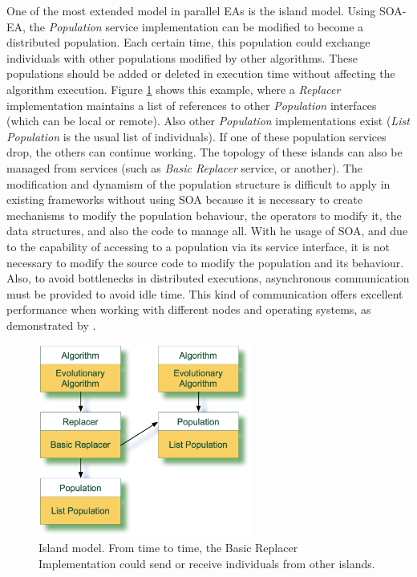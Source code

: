One of the most extended model in parallel EAs is the island model. Using SOA-EA, the {\em Population} service implementation can be modified to become a distributed population. Each certain time, this population could exchange individuals with other populations modified by other algorithms. These populations should be added or deleted in execution time without affecting the algorithm execution. Figure \ref{POPULATION} shows this example, where a {\em Replacer} implementation maintains a list of references to other {\em Population} interfaces (which can be local or remote). Also other {\em Population} implementations exist ({\em List Population} is the usual list of individuals). If one of these population services drop, the others can continue working. The topology of these islands can also be managed from services (such as {\em Basic Replacer} service, or another). The  modification and dynamism of the population structure is difficult to apply in existing frameworks without using SOA because it is necessary to create mechanisms to modify the population behaviour, the operators to modify it, the data structures, and also the code to manage all. With he usage of SOA, and due to the capability of accessing to a population via its service interface, it is not necessary to modify the source code to modify the population and its behaviour. Also, to avoid bottlenecks in distributed executions, asynchronous communication must be provided to avoid idle time. This kind of communication offers excellent performance when working with different nodes and operating systems, as demonstrated by \cite{Alba2002Heterogeneous}.



\begin{figure}
\centering
\includegraphics[width=7cm]{gfx/soaea/island.jpg}
\caption{Island model. From time to time, the Basic Replacer Implementation could send or receive individuals from other islands.}
\label{POPULATION}
\end{figure}



